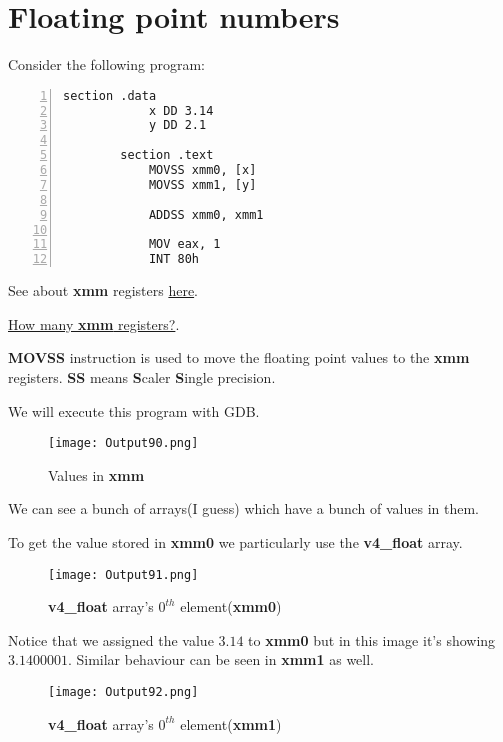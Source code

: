 \documentclass{article}
\makeatletter
\renewcommand\paragraph{\@startsection{paragraph}{4}{\z@}{-3.25ex \@plus -1ex \@minus -.2ex}{1.5ex \@plus .2ex}{\normalfont\normalsize\bfseries}}
\makeatother
\begin{document}
	\section{Floating point numbers}\label{sec:sec1}
	\paragraph{}
	Consider the following program:
	\begin{Verbatim}[numbers=left, frame=single]
		section .data
			x DD 3.14
			y DD 2.1
			
		section .text
			MOVSS xmm0, [x]
			MOVSS xmm1, [y]
			
			ADDSS xmm0, xmm1
			
			MOV eax, 1
			INT 80h
	\end{Verbatim}
See about \textbf{xmm} registers \href{https://www.oreilly.com/library/view/mastering-assembly-programming/9781787287488/50685a1c-0812-407c-8d7d-d7a9202722b3.xhtml}{here}. 

\vspace{10pt}
\href{https://stackoverflow.com/questions/10025360/how-many-xmm-registers-are-available-on-an-x86-processor-supporting-sse}{How many \textbf{xmm} registers?}.

\vspace{10pt}
\textbf{MOVSS} instruction is used to move the floating point values to the \textbf{xmm} registers. \textbf{SS} means \textbf{S}caler \textbf{S}ingle precision.

\vspace{10pt}
We will execute this program with GDB.
\begin{figure}[h]
	\centering
	\texttt{[image: Output90.png]}
	\caption{Values in \textbf{xmm}}
	\label{fig:fig1}
\end{figure}

We can see a bunch of arrays(I guess) which have a bunch of values in them.

To get the value stored in \textbf{xmm0} we particularly use the \textbf{v4\_float} array.
\begin{figure}[h]
	\centering
	\texttt{[image: Output91.png]}
	\caption{\textbf{v4\_float} array's $0^{th}$ element(\textbf{xmm0})}
	\label{fig:fig2}
\end{figure}

Notice that we assigned the value $3.14$ to \textbf{xmm0} but in this image it's showing $3.1400001$.
\newpage
Similar behaviour can be seen in \textbf{xmm1} as well.
\begin{figure}[h]
	\centering
	\texttt{[image: Output92.png]}
	\caption{\textbf{v4\_float} array's $0^{th}$ element(\textbf{xmm1})}
	\label{fig:fig3}
\end{figure}
\end{document}
